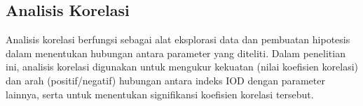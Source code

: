 \begin{spacing}{1.5}

	\subsection[Analisis Korelasi]{Analisis Korelasi}
		Analisis korelasi berfungsi sebagai alat eksplorasi data dan pembuatan hipotesis dalam menentukan hubungan antara parameter yang diteliti. Dalam penelitian ini, analisis korelasi digunakan untuk mengukur kekuatan (nilai koefisien korelasi) dan arah (positif/negatif) hubungan antara indeks IOD dengan parameter lainnya, serta untuk menentukan signifikansi koefisien korelasi tersebut.
		

\end{spacing}
